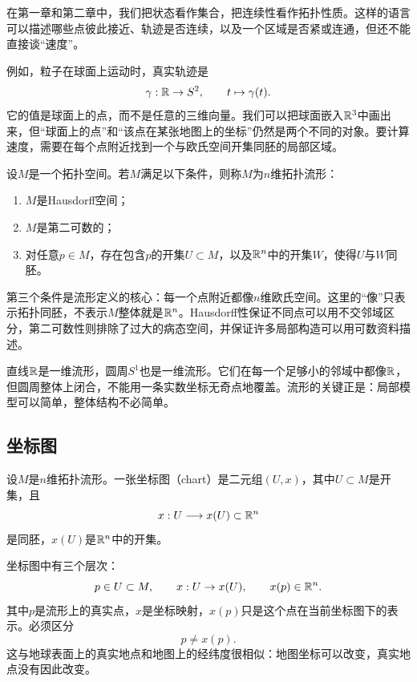 在第一章和第二章中，我们把状态看作集合，把连续性看作拓扑性质。这样的语言可以描述哪些点彼此接近、轨迹是否连续，以及一个区域是否紧或连通，但还不能直接谈“速度”。

例如，粒子在球面上运动时，真实轨迹是
\[
    \gamma:\mathbb{R}\to S^2,\qquad t\mapsto\gamma(t).
\]
它的值是球面上的点，而不是任意的三维向量。我们可以把球面嵌入$\mathbb{R}^3$中画出来，但“球面上的点”和“该点在某张地图上的坐标”仍然是两个不同的对象。要计算速度，需要在每个点附近找到一个与欧氏空间开集同胚的局部区域。

\begin{definition}[拓扑流形]
设$M$是一个拓扑空间。若$M$满足以下条件，则称$M$为$n$维拓扑流形：
\begin{enumerate}
    \item $M$是Hausdorff空间；
    \item $M$是第二可数的；
    \item 对任意$p\in M$，存在包含$p$的开集$U\subset M$，以及$\mathbb{R}^n$中的开集$W$，使得$U$与$W$同胚。
\end{enumerate}
\end{definition}

第三个条件是流形定义的核心：每一个点附近都像$n$维欧氏空间。这里的“像”只表示拓扑同胚，不表示$M$整体就是$\mathbb{R}^n$。Hausdorff性保证不同点可以用不交邻域区分，第二可数性则排除了过大的病态空间，并保证许多局部构造可以用可数资料描述。

\begin{remark}[局部与整体]
直线$\mathbb{R}$是一维流形，圆周$S^1$也是一维流形。它们在每一个足够小的邻域中都像$\mathbb{R}$，但圆周整体上闭合，不能用一条实数坐标无奇点地覆盖。流形的关键正是：局部模型可以简单，整体结构不必简单。
\end{remark}

\subsection{坐标图}

\begin{definition}[坐标图]
设$M$是$n$维拓扑流形。一张坐标图（chart）是二元组$(U,x)$，其中$U\subset M$是开集，且
\[
    x:U\longrightarrow x(U)\subset\mathbb{R}^n
\]
是同胚，$x(U)$是$\mathbb{R}^n$中的开集。
\end{definition}

坐标图中有三个层次：
\[
    p\in U\subset M,\qquad
    x:U\to x(U),\qquad
    x(p)\in\mathbb{R}^n.
\]
其中$p$是流形上的真实点，$x$是坐标映射，$x(p)$只是这个点在当前坐标图下的表示。必须区分
\[
    p\neq x(p).
\]
这与地球表面上的真实地点和地图上的经纬度很相似：地图坐标可以改变，真实地点没有因此改变。

